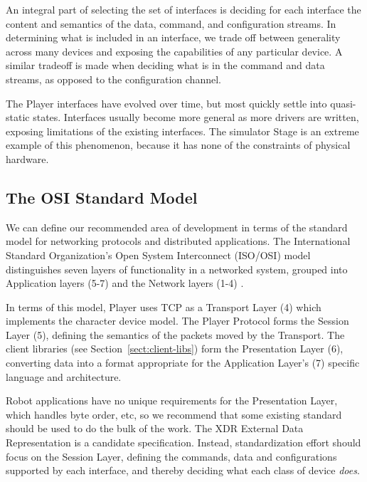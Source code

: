 \documentclass[letterpaper, 10 pt, conference]{iros03}
\begin{document}
An integral part of selecting the set of interfaces is deciding for
each interface the content and semantics of the data, command, and
configuration streams.  In determining what is included in an
interface, we trade off between generality across many devices and
exposing the capabilities of any particular device.  A similar
tradeoff is made when deciding what is in the command and data
streams, as opposed to the configuration channel.

The Player interfaces have evolved over time, but most quickly settle
into quasi-static states.  Interfaces usually become more general as
more drivers are written, exposing limitations of the existing
interfaces.  The simulator Stage is an extreme example of this
phenomenon, because it has none of the constraints of physical
hardware.

\subsection{The OSI Standard Model}
\label{sec-osi}

We can define our recommended area of development in terms of the
standard model for networking protocols and distributed applications.
The International Standard Organization's Open System Interconnect
(ISO/OSI) model distinguishes seven layers of functionality in a
networked system, grouped into Application layers (5-7) and the
Network layers (1-4) \cite{TannenbaumNetworks}.

In terms of this model, Player uses TCP as a Transport Layer (4) which
implements the character device model.  The Player Protocol forms the Session
Layer (5), defining the semantics of the packets moved by the Transport. The
client libraries (see Section~\ref{sect:client-libs}) form the Presentation
Layer (6), converting data into a format appropriate for the Application
Layer's (7) specific language and architecture.

Robot applications have no unique requirements for the Presentation
Layer, which handles byte order, etc, so we recommend that some
existing standard should be used to do the bulk of the work. The XDR
External Data Representation \cite{XdrRfc} is a candidate
specification. Instead, standardization effort should focus on the
Session Layer, defining the commands, data and configurations
supported by each interface, and thereby deciding what each class of
device 
{\em does}.
\end{document}
